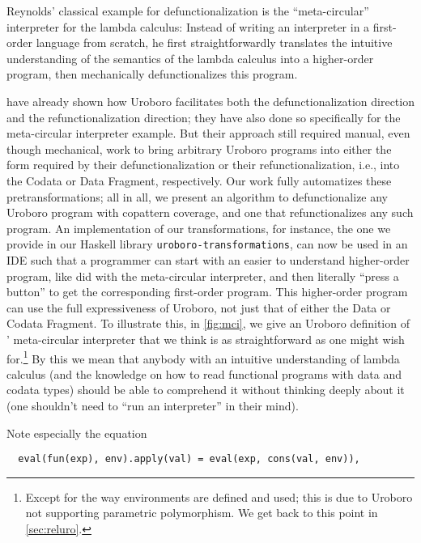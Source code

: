 Reynolds' classical example for defunctionalization is the ``meta-circular'' interpreter for the lambda calculus\citep{reynolds72definitional}: Instead of writing an interpreter in a first-order language from scratch, he first straightforwardly translates the intuitive understanding of the semantics of the lambda calculus into a higher-order program, then mechanically defunctionalizes this program.

\citet{rendel15automatic} have already shown how Uroboro facilitates both the defunctionalization direction and the refunctionalization direction; they have also done so specifically for the meta-circular interpreter example. But their approach still required manual, even though mechanical, work to bring arbitrary Uroboro programs into either the form required by their defunctionalization or their refunctionalization, i.e., into the Codata or Data Fragment, respectively. Our work fully automatizes these pretransformations; all in all, we present an algorithm to defunctionalize any Uroboro program with copattern coverage, and one that refunctionalizes any such program. An implementation of our transformations, for instance, the one we provide in our Haskell library \texttt{uroboro-transformations}, can now be used in an IDE such that a programmer can start with an easier to understand higher-order program, like \citet{reynolds72definitional} did with the meta-circular interpreter, and then literally ``press a button'' to get the corresponding first-order program. This higher-order program can use the full expressiveness of Uroboro, not just that of either the Data or Codata Fragment. To illustrate this, in \autoref{fig:mci}, we give an Uroboro definition of \citeauthor{reynolds72definitional}' meta-circular interpreter that we think is as straightforward as one might wish for.\footnote{Except for the way environments are defined and used; this is due to Uroboro not supporting parametric polymorphism. We get back to this point in \autoref{sec:reluro}.} By this we mean that anybody with an intuitive understanding of lambda calculus (and the knowledge on how to read functional programs with data and codata types) should be able to comprehend it without thinking deeply about it (one shouldn't need to ``run an interpreter'' in their mind).

Note especially the equation

\begin{lstlisting}
  eval(fun(exp), env).apply(val) = eval(exp, cons(val, env)),
\end{lstlisting}

